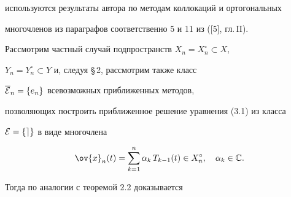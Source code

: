 используются результаты автора по методам коллокаций и ортогональных


многочленов из параграфов соответственно 5 и 11 из ([5], гл.\,II).





Рассмотрим частный случай подпространств $X_n=X_n^\circ\subset X$,


$Y_n=Y_n^\circ\subset Y$ и, следуя \S\,2, рассмотрим также класс


$\overline{\cal E}_n=\{ e_n\}$ всевозможных приближенных методов,


позволяющих построить приближенное решение уравнения (3.1) из класса


$\cal E=\{ e\} $ в виде многочлена


\begin{equation}


\ov{x}_n(t)=\sum_{k=1}^n\alpha_k\, T_{k-1}(t)\in X_n^\circ ,


\quad \alpha_k\in \Bbb C.


\end{equation}


Тогда по аналогии с теоремой 2.2 доказывается





